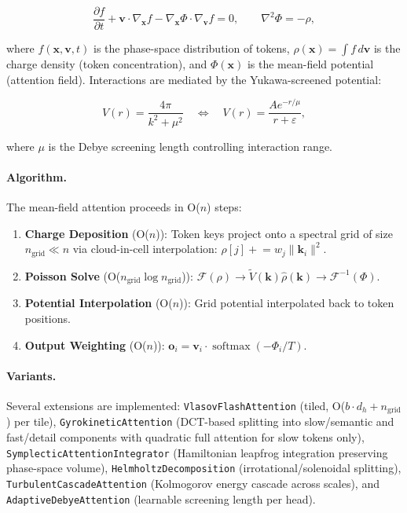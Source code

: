 \documentclass[11pt,a4paper,twocolumn]{article}
\begin{document}
\begin{equation}
	\label{eq:vlasov}
	\frac{\partial f}{\partial t} + \mathbf{v} \cdot \nabla_{\mathbf{x}} f - \nabla_{\mathbf{x}} \Phi \cdot \nabla_{\mathbf{v}} f = 0,
	\qquad \nabla^2 \Phi = -\rho,
\end{equation}

where $f(\mathbf{x}, \mathbf{v}, t)$ is the phase-space distribution of tokens, $\rho(\mathbf{x}) = \int f\,d\mathbf{v}$ is the charge density (token concentration), and $\Phi(\mathbf{x})$ is the mean-field potential (attention field). Interactions are mediated by the Yukawa-screened potential:

\begin{equation}
	\label{eq:yukawa}
	V(r) = \frac{4\pi}{k^2 + \mu^2} \quad\Longleftrightarrow\quad V(r) = \frac{A e^{-r/\mu}}{r + \varepsilon},
\end{equation}

where $\mu$ is the Debye screening length controlling interaction range.

\paragraph{Algorithm.}
The mean-field attention proceeds in O($n$) steps:

\begin{enumerate}
	\item \textbf{Charge Deposition} (O($n$)): Token keys project onto a spectral grid of size $n_\text{grid} \ll n$ via cloud-in-cell interpolation: $\rho[j] \mathrel{+}= w_j \|\mathbf{k}_i\|^2$.
	\item \textbf{Poisson Solve} (O($n_\text{grid} \log n_\text{grid}$)): $\mathcal{F}(\rho) \to \tilde{V}(\mathbf{k}) \hat{\rho}(\mathbf{k}) \to \mathcal{F}^{-1}(\Phi)$.
	\item \textbf{Potential Interpolation} (O($n$)): Grid potential interpolated back to token positions.
	\item \textbf{Output Weighting} (O($n$)): $\mathbf{o}_i = \mathbf{v}_i \cdot \operatorname{softmax}(-\Phi_i / T)$.
\end{enumerate}

\paragraph{Variants.}
Several extensions are implemented: \texttt{VlasovFlashAttention} (tiled, O($b \cdot d_h + n_\text{grid}$) per tile), \texttt{GyrokineticAttention} (DCT-based splitting into slow/semantic and fast/detail components with quadratic full attention for slow tokens only), \texttt{SymplecticAttentionIntegrator} (Hamiltonian leapfrog integration preserving phase-space volume), \texttt{HelmholtzDecomposition} (irrotational/solenoidal splitting), \texttt{TurbulentCascadeAttention} (Kolmogorov energy cascade across scales), and \texttt{AdaptiveDebyeAttention} (learnable screening length per head).
\end{document}
